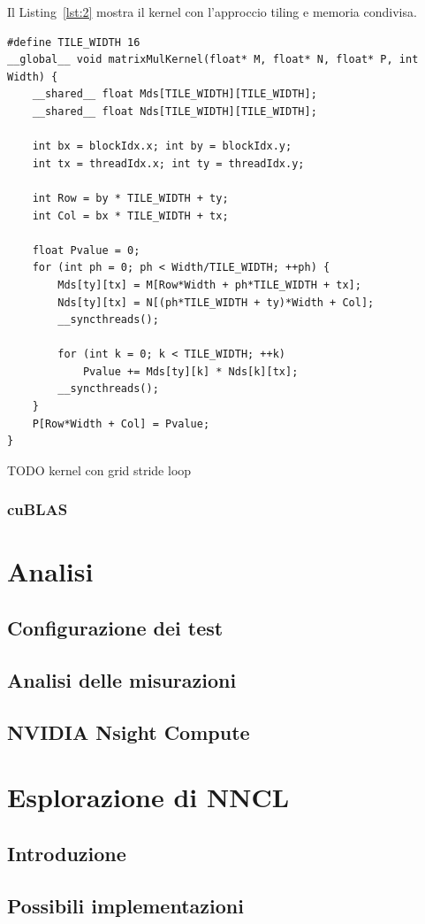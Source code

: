 \documentclass[a4paper]{article}
\begin{document}
Il Listing~\ref{lst:2} mostra il kernel con l'approccio tiling e memoria condivisa.

\begin{lstlisting}[caption={Kernel CUDA con tiling e memoria condivisa}, label={lst:2}]
#define TILE_WIDTH 16
__global__ void matrixMulKernel(float* M, float* N, float* P, int Width) {
    __shared__ float Mds[TILE_WIDTH][TILE_WIDTH];
    __shared__ float Nds[TILE_WIDTH][TILE_WIDTH];

    int bx = blockIdx.x; int by = blockIdx.y;
    int tx = threadIdx.x; int ty = threadIdx.y;

    int Row = by * TILE_WIDTH + ty;
    int Col = bx * TILE_WIDTH + tx;

    float Pvalue = 0;
    for (int ph = 0; ph < Width/TILE_WIDTH; ++ph) {
        Mds[ty][tx] = M[Row*Width + ph*TILE_WIDTH + tx];
        Nds[ty][tx] = N[(ph*TILE_WIDTH + ty)*Width + Col];
        __syncthreads();

        for (int k = 0; k < TILE_WIDTH; ++k)
            Pvalue += Mds[ty][k] * Nds[k][tx];
        __syncthreads();
    }
    P[Row*Width + Col] = Pvalue;
}
\end{lstlisting}

TODO kernel con grid stride loop

\subsubsection{cuBLAS}

\section{Analisi}

\subsection{Configurazione dei test}

\subsection{Analisi delle misurazioni}

\subsection{NVIDIA Nsight Compute}

\section{Esplorazione di NNCL}

\subsection{Introduzione}

\subsection{Possibili implementazioni}

\printbibliography
\end{document}
